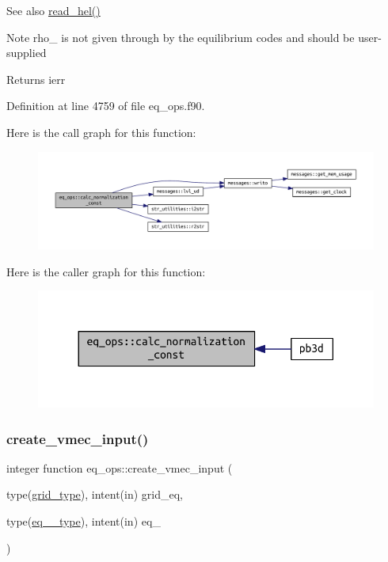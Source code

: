 \begin{DoxySeeAlso}{See also}
\hyperlink{namespacehelena__ops_ae05ba1182eb002d93c27ca4ff7ab8cf2}{read\+\_\+hel()}
\end{DoxySeeAlso}
\begin{DoxyNote}{Note}
{\ttfamily rho\+\_} is not given through by the equilibrium codes and should be user-\/supplied
\end{DoxyNote}
\begin{DoxyReturn}{Returns}
ierr 
\end{DoxyReturn}


Definition at line 4759 of file eq\+\_\+ops.\+f90.

Here is the call graph for this function\+:\nopagebreak
\begin{figure}[H]
\begin{center}
\leavevmode
\includegraphics[width=350pt]{namespaceeq__ops_a7cd38586e386e1bc684a327ebcc4c1de_cgraph}
\end{center}
\end{figure}
Here is the caller graph for this function\+:\nopagebreak
\begin{figure}[H]
\begin{center}
\leavevmode
\includegraphics[width=330pt]{namespaceeq__ops_a7cd38586e386e1bc684a327ebcc4c1de_icgraph}
\end{center}
\end{figure}
\mbox{\label{namespaceeq__ops_a9addef683b3d4a8c587510e4c994ec61}} 
\subsubsection{\texorpdfstring{create\+\_\+vmec\+\_\+input()}{create\_vmec\_input()}}
{\footnotesize\ttfamily integer function eq\+\_\+ops\+::create\+\_\+vmec\+\_\+input (\begin{DoxyParamCaption}\item[{type(\hyperlink{structgrid__vars_1_1grid__type}{grid\+\_\+type}), intent(in)}]{grid\+\_\+eq,  }\item[{type(\hyperlink{structeq__vars_1_1eq__1__type}{eq\+\_\+1\+\_\+type}), intent(in)}]{eq\+\_ }\end{DoxyParamCaption})}



